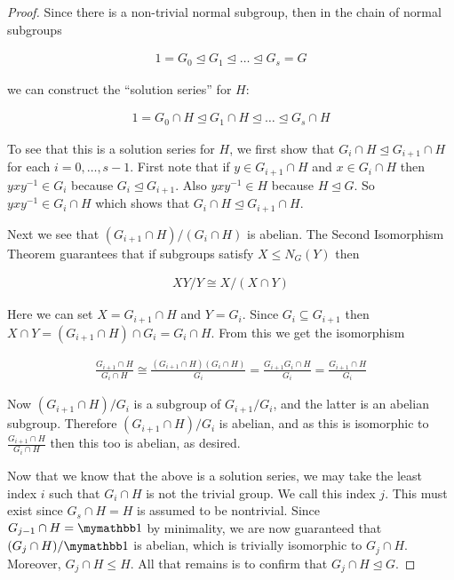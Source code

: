 \documentclass{exam}
\begin{document}
\begin{questions}
\begin{proof}
  Since there is a non-trivial normal subgroup, then in the chain of normal subgroups

  \begin{align*}
    1=G_0\trianglelefteq G_1 \trianglelefteq \dots \trianglelefteq G_s=G
  \end{align*}

  we can construct the ``solution series'' for $H$:

  \begin{align*}
    1=G_0\cap H \trianglelefteq G_1\cap H \trianglelefteq \dots \trianglelefteq G_s\cap H
  \end{align*}

  To see that this is a solution series for $H$, we first show that $G_i\cap H \trianglelefteq G_{i+1}\cap H$ for each $i=0,\dots,s-1$.  First note that if $y\in G_{i+1}\cap H$ and $x\in G_i\cap H$ then $yxy^{-1}\in G_i$ because $G_i\trianglelefteq G_{i+1}$.  Also $yxy^{-1}\in H$ because $H\trianglelefteq G$.  So $yxy^{-1}\in G_i\cap H$ which shows that $G_i\cap H\trianglelefteq G_{i+1}\cap H$.

  Next we see that $(G_{i+1}\cap H)/(G_i\cap H)$ is abelian.  The Second Isomorphism Theorem guarantees that if subgroups satisfy $X\leq N_G(Y)$ then

  \begin{align*}
    XY/Y \cong X/(X\cap Y)
  \end{align*}

  Here we can set $X = G_{i+1}\cap H$ and $Y = G_i$.  Since $G_i\subseteq G_{i+1}$ then $X\cap Y = (G_{i+1}\cap H)\cap G_i = G_i\cap H$.  From this we get the isomorphism

  \begin{align*}
    \frac{G_{i+1}\cap H}{G_i\cap H}\cong \frac{(G_{i+1}\cap H)(G_i\cap H)}{G_i} = \frac{G_{i+1}G_i\cap H}{G_i} = \frac{G_{i+1}\cap H}{G_i}
  \end{align*}

  Now $(G_{i+1}\cap H)/G_i$ is a subgroup of $G_{i+1}/G_i$, and the latter is an abelian subgroup.  Therefore $(G_{i+1}\cap H)/G_i$ is abelian, and as this is isomorphic to $\frac{G_{i+1}\cap H}{G_i\cap H}$ then this too is abelian, as desired.

  Now that we know that the above is a solution series, we may take the least index $i$ such that $G_i\cap H$ is not the trivial group.  We call this index $j$.  This must exist since $G_s\cap H = H$ is assumed to be nontrivial.  Since $G_{j-1}\cap H=\mymathbb 1$ by minimality, we are now guaranteed that $(G_j\cap H)/\mymathbb 1$ is abelian, which is trivially isomorphic to $G_j\cap H$.  Moreover, $G_j\cap H \leq H$. All that remains is to confirm that $G_j\cap H\trianglelefteq G$.


\end{proof}
\end{questions}
\end{document}
